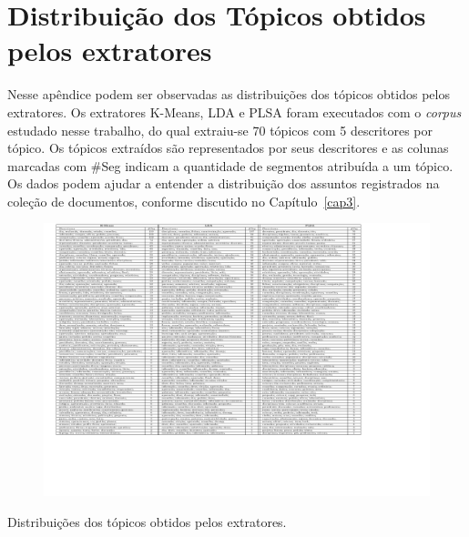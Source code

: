 \chapter{ Distribuição dos Tópicos obtidos pelos extratores}\label{apendice3}




Nesse apêndice podem ser observadas as distribuições dos tópicos obtidos pelos extratores.
Os extratores K-Means, LDA e PLSA foram executados com o \textit{corpus} estudado nesse trabalho, do qual extraiu-se 70 tópicos com 5 descritores por tópico. Os tópicos extraídos são representados por seus descritores e as colunas marcadas com \#Seg indicam a quantidade de segmentos atribuída a um tópico.
Os dados podem ajudar a entender a distribuição dos assuntos registrados na coleção de documentos, conforme discutido no Capítulo~\ref{cap3}.

\begin{landscape}%







\begin{figure}[h]
\center
	\includegraphics[trim={ 40 600 200 0 }, page=1,width=1.2\textwidth]{anexos/tabelas/distribuicao-topicos/distribuicao-topicos.pdf}
\end{figure}





\begin{table}[b]
	\caption{Distribuições dos tópicos obtidos pelos extratores.}
\end{table}




\end{landscape}


